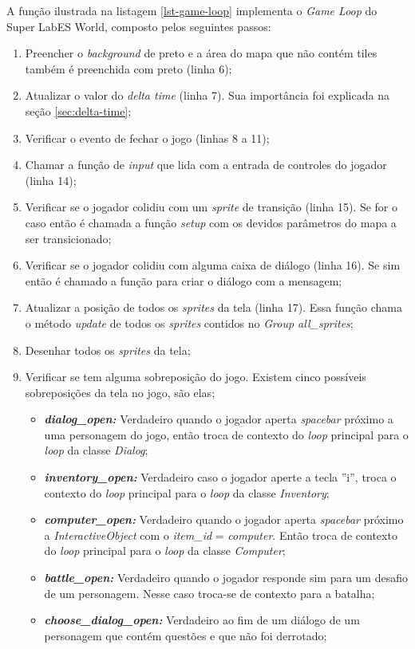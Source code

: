A função ilustrada na listagem \ref{lst-game-loop} implementa o \textit{Game Loop} do Super LabES World, composto pelos seguintes passos:
\begin{enumerate}
    \item Preencher o \textit{background} de preto e a área do mapa que não contém tiles também é preenchida com preto (linha 6);
    \item Atualizar o valor do \textit{delta time} (linha 7). Sua importância foi explicada na seção \ref{sec:delta-time};
    \item Verificar o evento de fechar o jogo (linhas 8 a 11);
    \item Chamar a função de \textit{input} que lida com a entrada de controles do jogador (linha 14);
    \item Verificar se o jogador colidiu com um \textit{sprite} de transição (linha 15). Se for o caso então é chamada a função \textit{setup} com os devidos parâmetros do mapa a ser transicionado;
    \item Verificar se o jogador colidiu com alguma caixa de diálogo (linha 16). Se sim então é chamado a função para criar o diálogo com a mensagem;
    \item Atualizar a posição de todos os \textit{sprites} da tela (linha 17). Essa função chama o método \textit{update} de todos os \textit{sprites} contidos no \textit{Group all\_sprites}; 
    \item Desenhar todos os \textit{sprites} da tela;
    \item Verificar se tem alguma sobreposição do jogo. Existem cinco possíveis sobreposições da tela no jogo, são elas;
        \begin{itemize}
        \item \textit{\textbf{dialog\_open: }} Verdadeiro quando o jogador aperta \textit{spacebar} próximo a uma personagem do jogo, então troca de contexto do \textit{loop} principal para o \textit{loop} da classe \textit{Dialog};
        \item \textit{\textbf{inventory\_open: }}Verdadeiro caso o jogador aperte a tecla ''i'', troca o contexto do \textit{loop} principal para o \textit{loop} da classe \textit{Inventory}; 
        \item \textit{\textbf{computer\_open: }} Verdadeiro quando o jogador aperta \textit{spacebar} próximo a \textit{InteractiveObject} com o \textit{item\_id} = \textit{computer}. Então troca de contexto do \textit{loop} principal para o \textit{loop} da classe \textit{Computer};
        \item \textit{\textbf{battle\_open: }}  Verdadeiro quando o jogador responde sim para um desafio de um personagem. Nesse caso troca-se de contexto para a batalha;
        \item \textit{\textbf{choose\_dialog\_open: }} Verdadeiro ao fim de um diálogo de um personagem que contém questões e que não foi derrotado;
    \end{itemize}
\end{enumerate}


